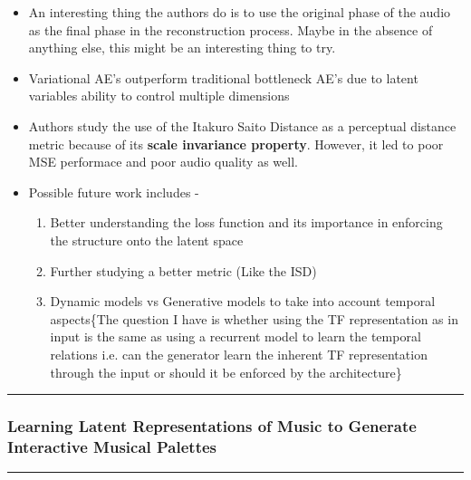 \documentclass[11pt]{article}
\providecommand{\tightlist}{%
      \setlength{\itemsep}{0pt}\setlength{\parskip}{0pt}}
\begin{document}
    \begin{itemize}
\tightlist
\item
  An interesting thing the authors do is to use the original phase of
  the audio as the final phase in the reconstruction process. Maybe in
  the absence of anything else, this might be an interesting thing to
  try.
\item
  Variational AE's outperform traditional bottleneck AE's due to latent
  variables ability to control multiple dimensions
\item
  Authors study the use of the Itakuro Saito Distance as a perceptual
  distance metric because of its \textbf{scale invariance property}.
  However, it led to poor MSE performace and poor audio quality as well.
\item
  Possible future work includes -

  \begin{enumerate}
  \def\labelenumi{\arabic{enumi}.}
  \tightlist
  \item
    Better understanding the loss function and its importance in
    enforcing the structure onto the latent space
  \item
    Further studying a better metric (Like the ISD)
  \item
    Dynamic models vs Generative models to take into account temporal
    aspects\{The question I have is whether using the TF representation
    as in input is the same as using a recurrent model to learn the
    temporal relations i.e. can the generator learn the inherent TF
    representation through the input or should it be enforced by the
    architecture\}
  \end{enumerate}
\end{itemize}

    \begin{center}\rule{0.5\linewidth}{\linethickness}\end{center}

\subsubsection{Learning Latent Representations of Music to Generate
Interactive Musical
Palettes}\label{learning-latent-representations-of-music-to-generate-interactive-musical-palettes}

\begin{center}\rule{0.5\linewidth}{\linethickness}\end{center}
\end{document}
